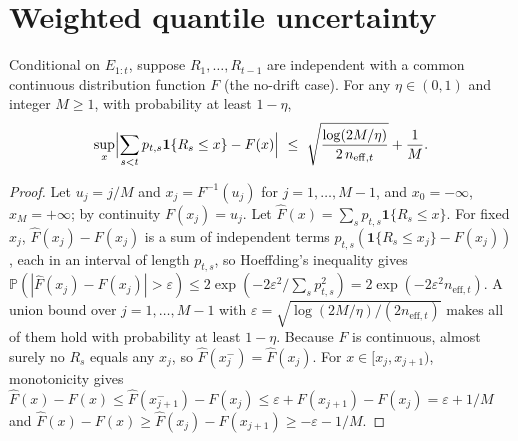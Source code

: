 \section{Weighted quantile uncertainty}\label{app:ess}
\begin{proposition}\label{prop:ess}
Conditional on $E_{1:t}$, suppose $R_1,\dots,R_{t-1}$ are independent with a common continuous distribution function $F$ (the no-drift case). For any
$\eta\in(0,1)$ and integer $M\ge 1$, with probability at least $1-\eta$,
\[
 \sup_{x}\Bigl|\sum_{s<t}p_{t,s}\mathbf 1\{R_s\le x\}-F(x)\Bigr|\ \le\ \sqrt{\frac{\log(2M/\eta)}{2\,n_{\mathrm{eff},t}}}+\frac1M .
\]
\end{proposition}

\begin{proof}
Let $u_j=j/M$ and $x_j=F^{-1}(u_j)$ for $j=1,\dots,M-1$, and $x_0=-\infty$, $x_M=+\infty$; by continuity
$F(x_j)=u_j$. Let $\hat F(x)=\sum_s p_{t,s}\mathbf 1\{R_s\le x\}$. For fixed $x_j$, $\hat F(x_j)-F(x_j)$ is a
sum of independent terms $p_{t,s}(\mathbf 1\{R_s\le x_j\}-F(x_j))$, each in an interval of length $p_{t,s}$, so Hoeffding's
inequality gives $\mathbb P(|\hat F(x_j)-F(x_j)|>\varepsilon)\le 2\exp(-2\varepsilon^2/\sum_s p_{t,s}^2)=2\exp(-2\varepsilon^2n_{\mathrm{eff},t})$.
A union bound over $j=1,\dots,M-1$ with $\varepsilon=\sqrt{\log(2M/\eta)/(2n_{\mathrm{eff},t})}$ makes all of them hold with probability at least $1-\eta$.
Because $F$ is continuous, almost surely no $R_s$ equals any $x_j$, so $\hat F(x_j^-)=\hat F(x_j)$. For $x\in[x_j,x_{j+1})$,
monotonicity gives $\hat F(x)-F(x)\le\hat F(x_{j+1}^-)-F(x_j)\le \varepsilon+F(x_{j+1})-F(x_j)=\varepsilon+1/M$ and
$\hat F(x)-F(x)\ge \hat F(x_j)-F(x_{j+1})\ge-\varepsilon-1/M$.
\end{proof}

